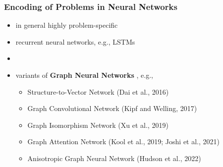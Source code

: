 \documentclass[aspectratio=1610]{beamer}
\newcommand{\important}[1]{{\color{green!60!black}#1}}
\renewcommand{\footnotesize}{\scriptsize}
\begin{document}



\begin{frame}
	\frametitle{Encoding of Problems in Neural Networks}

\begin{itemize}
	\itemsep1.3ex
	\item in general highly problem-specific
	\item recurrent neural networks, e.g., LSTMs
	\item {} \citep{vinyals-2015}
	\item variants of \important{\bf Graph Neural Networks} \citep{scarselli2008graph}, e.g.,
	\begin{itemize}
		\item Structure-to-Vector Network (Dai et al., 2016)
		\item Graph Convolutional Network (Kipf and Welling, 2017)
		\item Graph Isomorphism Network (Xu et al., 2019)
		\item Graph Attention Network (Kool et al., 2019; Joshi et al., 2021)
		\item Anisotropic Graph Neural Network (Hudson et al., 2022)
	\end{itemize}


\end{itemize}
\end{frame}
\end{document}
